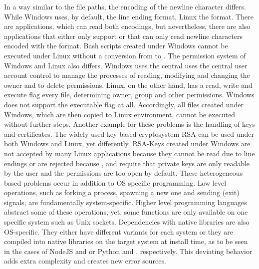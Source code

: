         In a way similar to the file paths, the encoding of the newline character differs. While Windows uses, by default, the  line ending format, Linux the  format. There are applications, which can read both encodings, but nevertheless, there are also applications that either only support  or that can only read newline characters encoded with the  format. Bash scripts created under Windows cannot be executed under Linux without a conversion from  to . The permission system of Windows and Linux also differs. Windows uses the central uses the central user account control to manage the processes of reading, modifying and changing the owner and to delete permissions. Linux, on the other hand, has a read, write and execute flag every file, determining owner, group and other permissions. Windows does not support the executable flag at all. Accordingly, all files created under Windows, which are then copied to Linux environment, cannot be executed without further steps. Another example for these problems is the handling of keys and certificates. The widely used key-based cryptosystem \ac{RSA} can be used under both Windows and Linux, yet differently. \ac{RSA}-Keys created under Windows are not accepted by many Linux applications because they cannot be read due to  line endings or are rejected because ,  and  require that private keys are only readable by the user and the permissions are too open by default.\newline
        These heterogeneous based problems occur in addition to \acl{OS} specific programming. Low level operations, such as forking a process, spawning a new one and sending (exit) signals, are fundamentally system-specific. Higher level programming languages abstract some of these operations, yet, some functions are only available on one specific system such as Unix sockets. Dependencies with native libraries are also \acl{OS}-specific. They either have different variants for each system or they are compiled into native libraries on the target system at install time, as to be seen in the cases of NodeJS and  or Python and , respectively. This deviating behavior adds extra complexity and creates new error sources.

